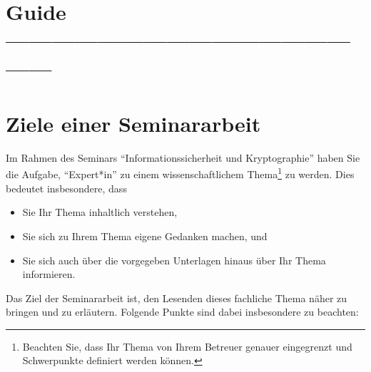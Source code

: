 \section*{Guide ---------------------------------------------------}

\section{Ziele einer Seminararbeit}
Im Rahmen des Seminars ``Informationssicherheit und Kryptographie'' haben Sie die Aufgabe,
``Expert*in'' zu einem wissenschaftlichem Thema\footnote{Beachten Sie, dass Ihr Thema von Ihrem
Betreuer genauer eingegrenzt und Schwerpunkte definiert werden können.} zu werden. Dies bedeutet
insbesondere, dass
\begin{itemize}
\item Sie Ihr Thema inhaltlich verstehen,
\item Sie sich zu Ihrem Thema eigene Gedanken machen, und
\item Sie sich auch über die vorgegeben Unterlagen hinaus über Ihr Thema informieren.
\end{itemize}


Das Ziel der Seminararbeit ist, den Lesenden dieses fachliche Thema näher zu bringen und zu
erläutern. Folgende Punkte sind dabei insbesondere zu beachten:

